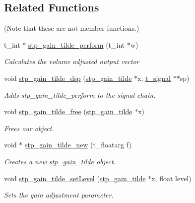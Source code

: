 \subsection*{Related Functions}
(Note that these are not member functions.) \begin{DoxyCompactItemize}
\item 
t\+\_\+int $\ast$ \hyperlink{structstp__gain__tilde_a1c7d55f58651664bf47911a741858a89}{stp\+\_\+gain\+\_\+tilde\+\_\+perform} (t\+\_\+int $\ast$w)
\begin{DoxyCompactList}\small\item\em Calculates the volume adjusted output vector~\newline
 \end{DoxyCompactList}\item 
void \hyperlink{structstp__gain__tilde_a44e6490aca114bc89548d4ec316638eb}{stp\+\_\+gain\+\_\+tilde\+\_\+dsp} (\hyperlink{structstp__gain__tilde}{stp\+\_\+gain\+\_\+tilde} $\ast$x, \hyperlink{struct__signal}{t\+\_\+signal} $\ast$$\ast$sp)
\begin{DoxyCompactList}\small\item\em Adds stp\+\_\+gain\+\_\+tilde\+\_\+perform to the signal chain. ~\newline
 \end{DoxyCompactList}\item 
void \hyperlink{structstp__gain__tilde_ac6dcde965f8cb9e6576179047f7951fe}{stp\+\_\+gain\+\_\+tilde\+\_\+free} (\hyperlink{structstp__gain__tilde}{stp\+\_\+gain\+\_\+tilde} $\ast$x)
\begin{DoxyCompactList}\small\item\em Frees our object. ~\newline
 \end{DoxyCompactList}\item 
void $\ast$ \hyperlink{structstp__gain__tilde_abd7b5011b953f4fe73564886bc67c984}{stp\+\_\+gain\+\_\+tilde\+\_\+new} (t\+\_\+floatarg f)
\begin{DoxyCompactList}\small\item\em Creates a new \hyperlink{structstp__gain__tilde}{stp\+\_\+gain\+\_\+tilde} object.~\newline
 \end{DoxyCompactList}\item 
void \hyperlink{structstp__gain__tilde_a724fa7ba5f9d719d188b109f207c7f9b}{stp\+\_\+gain\+\_\+tilde\+\_\+set\+Level} (\hyperlink{structstp__gain__tilde}{stp\+\_\+gain\+\_\+tilde} $\ast$x, float level)
\begin{DoxyCompactList}\small\item\em Sets the gain adjustment parameter. ~\newline

\end{DoxyCompactList}$$
\end{DoxyCompactItemize}
